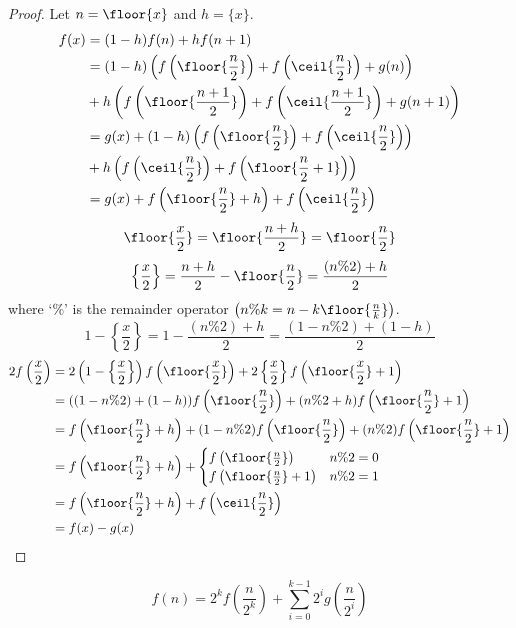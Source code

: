 \begin{proof}
Let $n = \floor{x}$ and $h = \{x\}$.
\begin{align*}
f(x) &= (1-h)f(n) + hf(n+1)
\\ &= (1-h)\left(f\left( \floor{\frac{n}{2}} \right) + f\left( \ceil{\frac{n}{2}} \right) + g(n)\right)
\\ &+ h\left(f\left( \floor{\frac{n+1}{2}} \right) + f\left( \ceil{\frac{n+1}{2}} \right) + g(n+1)\right)
\\ &= g(x) + (1-h)\left(f\left( \floor{\frac{n}{2}} \right) + f\left( \ceil{\frac{n}{2}} \right)\right)
\\ &+ h\left(f\left( \ceil{\frac{n}{2}} \right) + f\left( \floor{\frac{n}{2}+1} \right)\right)
\\ &= g(x) + f\left(\floor{\frac{n}{2}} + h\right) + f\left( \ceil{\frac{n}{2}} \right)
\end{align*}
\[ \floor{\frac{x}{2}} = \floor{\frac{n+h}{2}} = \floor{\frac{n}{2}} \]
\[ \left\{\frac{x}{2}\right\} = \frac{n+h}{2} - \floor{\frac{n}{2}} = \frac{(n\%2) + h}{2} \]
where `$\%$' is the remainder operator $\left(n\%k = n - k\floor{\frac{n}{k}}\right)$.
\[ 1 - \left\{\frac{x}{2}\right\} = 1 - \frac{(n\%2) + h}{2} = \frac{(1-n\%2) + (1-h)}{2} \]
\begin{align*}
2f\left(\frac{x}{2}\right)
&= 2\left(1-\left\{\frac{x}{2}\right\}\right)f\left(\floor{\frac{x}{2}}\right)
+ 2\left\{\frac{x}{2}\right\}f\left(\floor{\frac{x}{2}} + 1\right)
\\ &= ((1-n\%2) + (1-h))f\left(\floor{\frac{n}{2}}\right) + (n\%2 + h)f\left(\floor{\frac{n}{2}} + 1\right)
\\ &= f\left(\floor{\frac{n}{2}} + h\right)
+ (1-n\%2)f\left(\floor{\frac{n}{2}}\right) + (n\%2)f\left(\floor{\frac{n}{2}} + 1\right)
\\ &= f\left(\floor{\frac{n}{2}} + h\right)
+ \begin{cases}f\left(\floor{\frac{n}{2}}\right) & n\%2 = 0
\\ f\left(\floor{\frac{n}{2}} + 1\right) & n\%2 = 1 \end{cases}
\\ &= f\left(\floor{\frac{n}{2}} + h\right) + f\left(\ceil{\frac{n}{2}}\right)
\\ &= f(x) - g(x)
\end{align*}
\end{proof}

\begin{theorem}
\[ f(n) = 2^kf\left(\frac{n}{2^k}\right) + \sum_{i=0}^{k-1} 2^i g\left(\frac{n}{2^i}\right) \]
\end{theorem}

